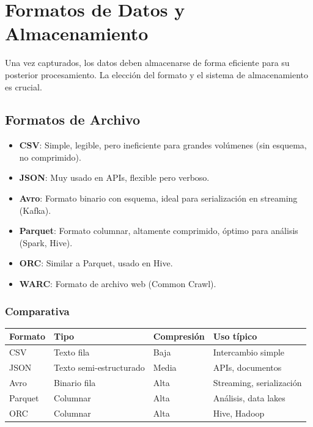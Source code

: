 \documentclass[12pt,a4paper,openany,oneside]{book}
\begin{document}
\chapter{Formatos de Datos y Almacenamiento}
Una vez capturados, los datos deben almacenarse de forma eficiente para su posterior procesamiento. La elección del formato y el sistema de almacenamiento es crucial.

\section{Formatos de Archivo}
\begin{itemize}
    \item \textbf{CSV}: Simple, legible, pero ineficiente para grandes volúmenes (sin esquema, no comprimido).
    \item \textbf{JSON}: Muy usado en APIs, flexible pero verboso.
    \item \textbf{Avro}: Formato binario con esquema, ideal para serialización en streaming (Kafka).
    \item \textbf{Parquet}: Formato columnar, altamente comprimido, óptimo para análisis (Spark, Hive).
    \item \textbf{ORC}: Similar a Parquet, usado en Hive.
    \item \textbf{WARC}: Formato de archivo web (Common Crawl).
\end{itemize}

\subsection{Comparativa}
\begin{center}
\begin{tabular}{|l|l|l|l|}
\hline
\textbf{Formato} & \textbf{Tipo} & \textbf{Compresión} & \textbf{Uso típico} \\ \hline
CSV & Texto fila & Baja & Intercambio simple \\
JSON & Texto semi-estructurado & Media & APIs, documentos \\
Avro & Binario fila & Alta & Streaming, serialización \\
Parquet & Columnar & Alta & Análisis, data lakes \\
ORC & Columnar & Alta & Hive, Hadoop \\ \hline
\end{tabular}
\end{center}
\end{document}
